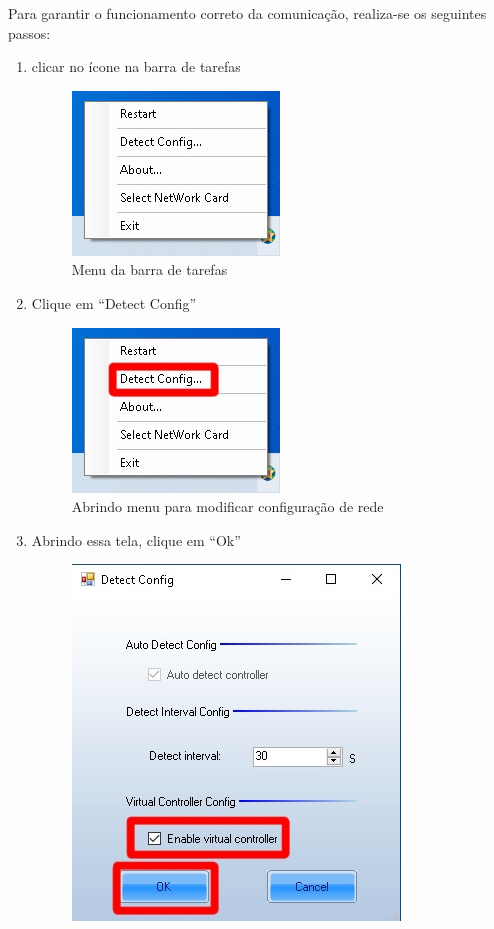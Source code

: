 \documentclass[12pt, a4paper]{article}
\begin{document}
Para garantir o funcionamento correto da comunicação, realiza-se os seguintes passos:
\begin{enumerate}
	\item clicar no ícone na barra de tarefas
	\begin{figure}[!htb]
		\centering
		\includegraphics{menuRede.jpg}
		\caption{\label{fig:menuRede.jpg}Menu da barra de tarefas}
	\end{figure}
	\newpage
	\item Clique em ``Detect Config''
	\begin{figure}[!htb]
		\centering
		\includegraphics{menuRede1.jpg}
		\caption{\label{fig:menuRede1.jpg}Abrindo menu para modificar configuração de rede}
	\end{figure}
	\item Abrindo essa tela, clique em ``Ok''
	\begin{figure}[!htb]
		\centering
		\includegraphics[scale=.8]{detectConfig.jpeg}

\end{figure}
\end{enumerate}
\end{document}
